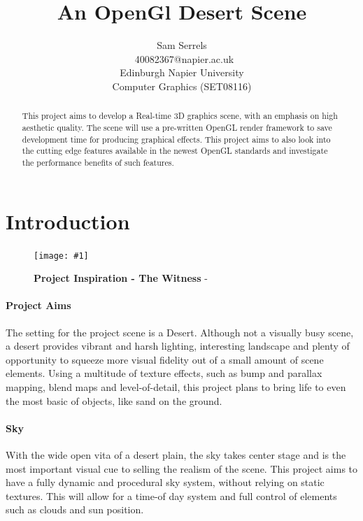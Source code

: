 \documentclass[conference]{acmsiggraph}
\title{An OpenGl Desert Scene}
\author{Sam Serrels\\\ 40082367@napier.ac.uk \\
Edinburgh Napier University\\
Computer Graphics (SET08116)}
\newcommand{\figuremacroW}[4]{
	\begin{figure}[h] %
		\centering
		\texttt{[image: \#1]}
		\caption[#2]{\textbf{#2} - #3}
		\label{fig:#1}
	\end{figure}
}
\begin{document}

\maketitle

\begin{abstract}
This project aims to develop a Real-time 3D graphics scene, with an emphasis on high aesthetic quality. The scene will use a pre-written OpenGL render framework to save development time for producing graphical effects. This project aims to also look into the cutting edge features available in the newest OpenGL standards and investigate the performance benefits of such features.
\end{abstract}

\keywordlist

\section{Introduction}

\figuremacroW
{witness}
{Project Inspiration - The Witness}
{\protect\cite{Witness}}
{1.0}

\paragraph{Project Aims}
The setting for the project scene is a Desert. Although not a visually busy scene, a desert provides vibrant and harsh lighting, interesting landscape and plenty of opportunity to squeeze more visual fidelity out of a small amount of scene elements.
Using a multitude of texture effects, such as bump and parallax mapping, blend maps and level-of-detail, this project plans to bring life to even the most basic of objects, like sand on the ground.

\paragraph{Sky}
With the wide open vita of a desert plain, the sky takes center stage and is the most important visual cue to selling the realism of the scene. This project aims to have a fully dynamic and procedural sky system, without relying on static textures. This will allow for a time-of day system and full control of elements such as clouds and sun position.
\end{document}
